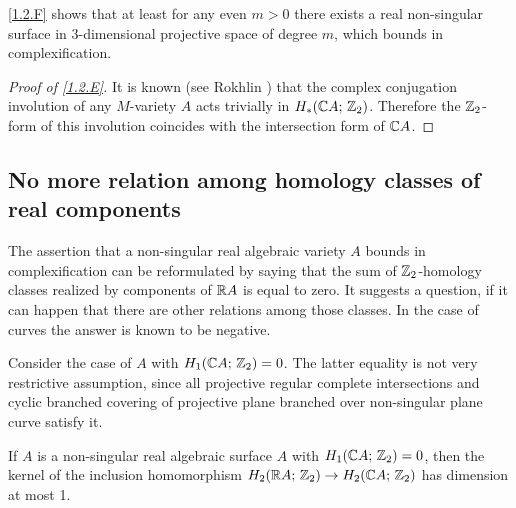 \documentclass{article}
\numberwithin{equation}{section}
\begin{document}
\ref{1.2.F} shows that at least for any even $m>0$ there exists
a real non-singular surface in 3-dimensional projective space of
degree $m$, which bounds in complexification.

\begin{proof}[Proof of \ref{1.2.E}] It is known (see Rokhlin \cite{R1}) that the
complex conjugation involution of any $M$-variety $A$ acts trivially
in $H_*(\mathbb C A;\,\mathbb Z_2)$. Therefore the $\mathbb Z_2$-form of this involution
coincides with the intersection form of $\mathbb C A$. 
\end{proof}

\subsection{No more relation among homology classes of real 
components}\label{s1.3} 
The assertion that a non-singular real algebraic variety $A$ bounds in
complexification can be reformulated by saying that the sum of
$\mathbb Z_2$-homology classes realized by components of $\mathbb R A$ is equal to
zero. It suggests a question, if it can happen that there are other
relations among those classes. In the case of curves the answer is
known to be negative.

Consider the case of $A$ with
$H_1(\mathbb C A;\,\mathbb Z_2)=0$. The latter equality is not very restrictive
assumption, since all projective regular complete intersections and
cyclic branched covering of projective plane branched over non-singular
plane curve satisfy it.
\begin{thm}\label{1.3.A}
If $A$ is a non-singular real algebraic surface $A$ with
$H_1(\mathbb C A;\,\mathbb Z_2)=0$, then the kernel of the inclusion homomorphism
$H_2(\mathbb R A;\,\mathbb Z_2)\to H_2(\mathbb C A;\,\mathbb Z_2)$ has dimension at most 1.
\end{thm}
\end{document}
